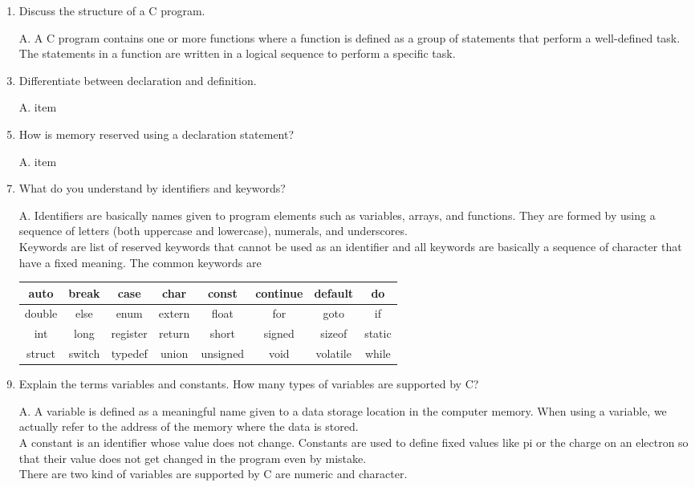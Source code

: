 \documentclass[fontsize=12pt,paper=a4]{book}
\begin{document}
\begin{enumerate}
 \item Discuss the structure of a C program.
 \item[A.]
       A C program contains one or more functions where a function is defined as a group of statements that perform a well-defined task. The statements in a function are written in a logical sequence to perform a specific task.
       
 \item Differentiate between declaration and definition.
 \item[A.] item
       
 \item How is memory reserved using a declaration statement?
 \item[A.] item
       
 \item What do you understand by identifiers and keywords?
 \item[A.]
       Identifiers are basically names given to program elements such as variables, arrays, and functions. They are formed by using a sequence of letters (both uppercase and lowercase), numerals, and underscores.\\
       Keywords are list of reserved keywords that cannot be used as an identifier and all keywords are basically a sequence of character that have a fixed meaning. The common keywords are\\
       \begin{tabular}{|c|c|c|c|c|c|c|c|}
        \hline
        auto   & break  & case     & char   & const    & continue & default  & do     \\
        \hline
        double & else   & enum     & extern & float    & for      & goto     & if     \\
        \hline
        int    & long   & register & return & short    & signed   & sizeof   & static \\
        \hline
        struct & switch & typedef  & union  & unsigned & void     & volatile & while  \\
        \hline
       \end{tabular}
       
 \item Explain the terms variables and constants. How many types of variables are supported by C?
 \item[A.] A variable is defined as a meaningful name given to a data storage location in the computer
       memory. When using a variable, we actually refer to the address of the memory where the data
       is stored.\\
       A constant is an identifier whose value does not change. Constants are used to define fixed values like pi or the charge on an electron so that their value does not get changed in the program even by mistake.\\
       There are two kind of variables are supported by C are numeric and character.
       

\end{enumerate}
\end{document}
